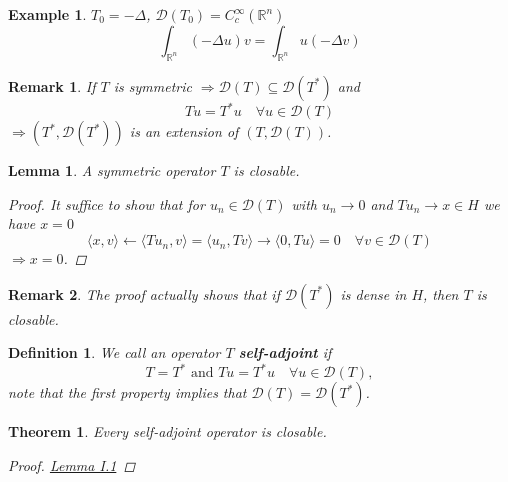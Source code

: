 \documentclass[12pt]{extreport} %
\newcommand{\R}{\mathbb{R}}
\newcommand{\DO}[1]{\mathcal{D}\left( {#1} \right)}
\theoremstyle{named}
\theoremstyle{nnamed}
\theoremstyle{itshape}
\newtheorem{definition}{Definition}  \counterwithin{definition}{chapter}
\newtheorem{theorem}{Theorem}  \counterwithin{theorem}{chapter}
\newtheorem{lemma}{Lemma}  \counterwithin{lemma}{chapter}
\theoremstyle{normal}
\newtheorem*{example}{Example}
\newtheorem*{remark}{Remark}
\begin{document}
\begin{example}
	$T_0 = - \Delta$, $\DO{T_0} = C_c^{\infty}(\R^n)$
	$$ \int_{\R^n} \left( - \Delta u \right) v = \int_{\R^n} u \left( - \Delta v \right) $$	
\end{example}

\begin{remark}
	If $T$ is symmetric $\Rightarrow \DO{T} \subseteq \DO{T^*}$ and
	$$ T u = T^* u \quad \forall u \in \DO{T} $$
	$\Rightarrow \left( T^*, \DO{T^*} \right)$ is an extension of $\left( T, \DO{T} \right)$.
\end{remark}

\begin{lemma} \label{I.1:lmm}
	A symmetric operator $T$ is closable.
	
	\begin{proof}
		It suffice to show that for $u_n \in \DO{T}$ with $u_n \rightarrow 0$ and $ T u_n \rightarrow x \in H$ we have $x = 0$
		$$ \langle x,  v \rangle \leftarrow \langle T u_n, v \rangle = \langle u_n , T v \rangle \rightarrow \langle 0, T u \rangle = 0 \quad \forall v \in \DO{T}  $$
		$\Rightarrow x = 0$.
	\end{proof}
\end{lemma}

\begin{remark}
	The proof actually shows that if $\DO{T^*}$ is dense in $H$, then $T$ is closable.	
\end{remark}

\begin{definition}
	We call an operator $T$ \textbf{self-adjoint} if 
		$$ T = T^* \text{ and }  Tu = T^* u \quad \forall u \in \DO{T},  $$ %
	note that the first property implies that $\DO{T} = \DO{T^*}$.
\end{definition}

\begin{theorem} \label{thm:1.4}
	Every self-adjoint operator is closable.
	
	\begin{proof}
		\hyperref[I.1:lmm]{Lemma I.1}
	\end{proof}
\end{theorem}
\end{document}
